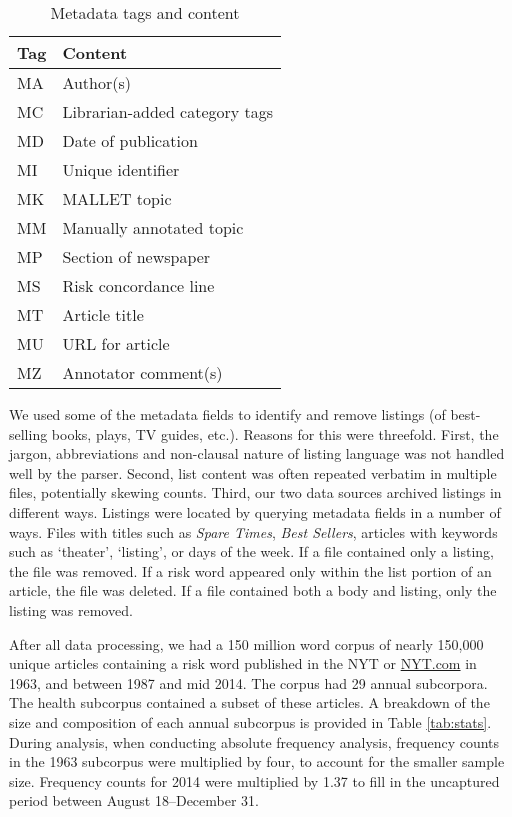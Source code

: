     \begin{table}\footnotesize \centering
    \begin{tabular}{|l|l|}
    \hline
    \textbf{Tag} & \textbf{Content}  \\ \hline
    MA    & Author(s)       \\ \hline
    MC    & Librarian-added category tags     \\ \hline
    MD    & Date of publication        \\ \hline
    MI    & Unique identifier       \\ \hline
    MK   & MALLET topic        \\ \hline
    MM    & Manually annotated topic  \\ \hline
    MP    & Section of newspaper \\ \hline
    MS    & Risk concordance line  \\ \hline
    MT    & Article title        \\ \hline
    MU    & URL for article         \\ \hline
    MZ    & Annotator comment(s)       \\ \hline
    \end{tabular}
    \caption{Metadata tags and content}
\end{table}
    
    We used some of the metadata fields to identify and remove listings (of best-selling books, plays, TV guides, etc.). Reasons for this were threefold. First, the jargon, abbreviations and non-clausal nature of listing language was not handled well by the parser. Second, list content was often repeated verbatim in multiple files, potentially skewing counts. Third, our two data sources archived listings in different ways. Listings were located by querying metadata fields in a number of ways. Files with titles such as \emph{Spare Times}, \emph{Best Sellers}, articles with keywords such as `theater', `listing', or days of the week. If a file contained only a listing, the file was removed. If a risk word appeared only within the list portion of an article, the file was deleted. If a file contained both a body and listing, only the listing was removed.

    After all data processing, we had a 150 million word corpus of nearly 150,000 unique articles containing a risk word published in the NYT or \url{NYT.com} in 1963, and between 1987 and mid 2014. The corpus had 29 annual subcorpora. The health subcorpus contained a subset of these articles. A breakdown of the size and composition of each annual subcorpus is provided in Table \ref{tab:stats}. During analysis, when conducting absolute frequency analysis, frequency counts in the 1963 subcorpus were multiplied by four, to account for the smaller sample size. Frequency counts for 2014 were multiplied by 1.37 to fill in the uncaptured period between August 18--December 31.

